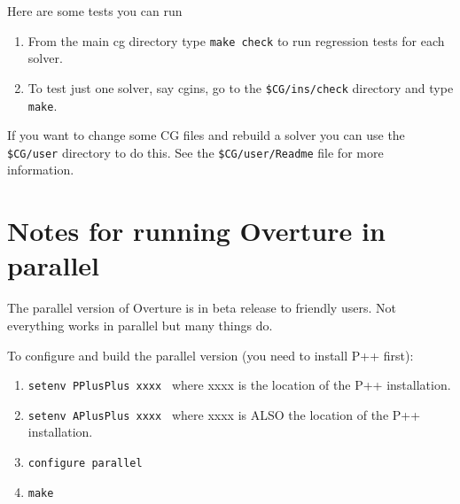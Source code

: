 \documentclass{article}
\begin{document}
Here are some tests you can run 
\begin{enumerate}
    \item From the main cg directory type {\tt make check} 
     to run regression tests for each solver.
    \item To test just one solver, say cgins, go to the {\tt \$CG/ins/check} directory and type {\tt make}. 
\end{enumerate}

If you want to change some CG files and rebuild a solver you can use the {\tt \$CG/user} directory
to do this. See the {\tt \$CG/user/Readme} file for more information.


\clearpage
\section{Notes for running Overture in parallel}


The parallel version of Overture is in beta release to friendly users. Not everything works in
parallel but many things do.

To configure and build the parallel version (you need to install P++ first):
\begin{enumerate}
  \item {\tt setenv PPlusPlus xxxx } where xxxx is the location of the P++ installation.
  \item {\tt setenv APlusPlus xxxx } where xxxx is ALSO the location of the P++ installation.
  \item {\tt configure parallel} 
  \item {\tt make} 
\end{enumerate}
\end{document}
